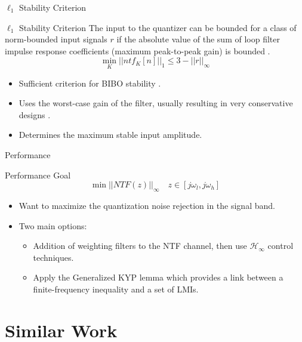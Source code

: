 \documentclass[10pt,usenames,dvipsnames]{beamer}
\begin{document}
\begin{frame}{$\ell_1$ Stability Criterion}

\begin{block}{$\ell_1$ Stability Criterion}
	The input to the quantizer can be bounded for a class of norm-bounded input signals $r$ if the absolute value of the sum of loop filter impulse response coefficients (maximum peak-to-peak gain) is bounded .
	\begin{equation*}
		\min_K ||ntf_K[n]||_1 \leq 3 - ||r||_\infty
	\end{equation*}
\end{block}
\pause
\begin{itemize}
	\item Sufficient criterion for BIBO stability \cite{Anastassiou1989}. \pause
	\item Uses the worst-case gain of the filter, usually resulting in very conservative designs \cite{Risbo1994}. \pause
	\item Determines the maximum stable input amplitude.
\end{itemize}

\end{frame}

\begin{frame}{Performance}

\begin{block}{Performance Goal}
	\begin{equation*}
		\min ||NTF(z)||_\infty \quad z \in [j\omega_l, j\omega_h]
	\end{equation*}
\end{block}
\pause
\begin{itemize}
	\item Want to maximize the quantization noise rejection in the signal band. \pause
	\item Two main options:
	\begin{itemize}
		\item Addition of weighting filters to the NTF channel, then use $\mathcal{H}_\infty$ control techniques. \pause
		\item Apply the Generalized KYP lemma which provides a link between a finite-frequency inequality and a set of LMIs.
	\end{itemize}
\end{itemize}

\end{frame}

\section{Similar Work}
\end{document}
